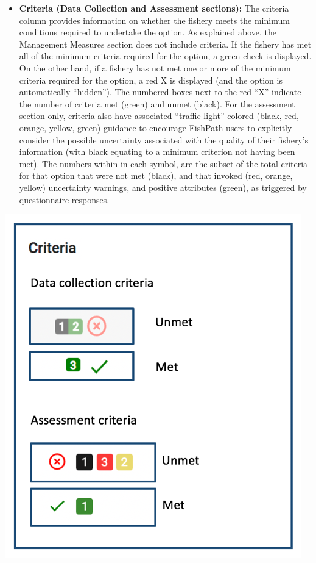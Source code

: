 \documentclass[
  11pt,
]{book}
\providecommand{\tightlist}{%
  \setlength{\itemsep}{0pt}\setlength{\parskip}{0pt}}
\begin{document}
\begin{itemize}
\tightlist
\item
  \textbf{Criteria (Data Collection and Assessment sections):} The criteria column provides information on whether the fishery meets the minimum conditions required to undertake the option. As explained above, the Management Measures section does not include criteria. If the fishery has met all of the minimum criteria required for the option, a green check is displayed. On the other hand, if a fishery has not met one or more of the minimum criteria required for the option, a red X is displayed (and the option is automatically ``hidden''). The numbered boxes next to the red ``X'' indicate the number of criteria met (green) and unmet (black). For the assessment section only, criteria also have associated ``traffic light'' colored (black, red, orange, yellow, green) guidance to encourage FishPath users to explicitly consider the possible uncertainty associated with the quality of their fishery's information (with black equating to a minimum criterion not having been met). The numbers within in each symbol, are the subset of the total criteria for that option that were not met (black), and that invoked (red, orange, yellow) uncertainty warnings, and positive attributes (green), as triggered by questionnaire responses.
\end{itemize}

\begin{center}\includegraphics[width=0.35\linewidth]{images/criteria} \end{center}
\end{document}
